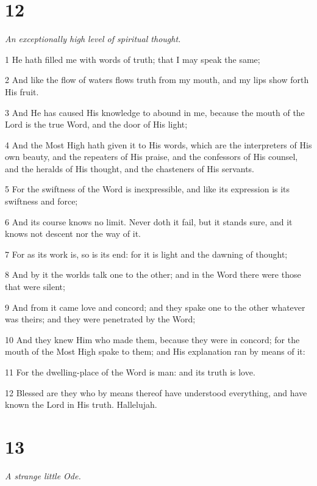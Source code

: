 \chapter{12}

\par \textit{An exceptionally high level of spiritual thought.}

\par 1 He hath filled me with words of truth; that I may speak the same;
\par 2 And like the flow of waters flows truth from my mouth, and my lips show forth His fruit.
\par 3 And He has caused His knowledge to abound in me, because the mouth of the Lord is the true Word, and the door of His light;
\par 4 And the Most High hath given it to His words, which are the interpreters of His own beauty, and the repeaters of His praise, and the confessors of His counsel, and the heralds of His thought, and the chasteners of His servants.
\par 5 For the swiftness of the Word is inexpressible, and like its expression is its swiftness and force;
\par 6 And its course knows no limit. Never doth it fail, but it stands sure, and it knows not descent nor the way of it.
\par 7 For as its work is, so is its end: for it is light and the dawning of thought;
\par 8 And by it the worlds talk one to the other; and in the Word there were those that were silent;
\par 9 And from it came love and concord; and they spake one to the other whatever was theirs; and they were penetrated by the Word;
\par 10 And they knew Him who made them, because they were in concord; for the mouth of the Most High spake to them; and His explanation ran by means of it:
\par 11 For the dwelling-place of the Word is man: and its truth is love.
\par 12 Blessed are they who by means thereof have understood everything, and have known the Lord in His truth. Hallelujah.

\chapter{13}

\par \textit{A strange little Ode.}


